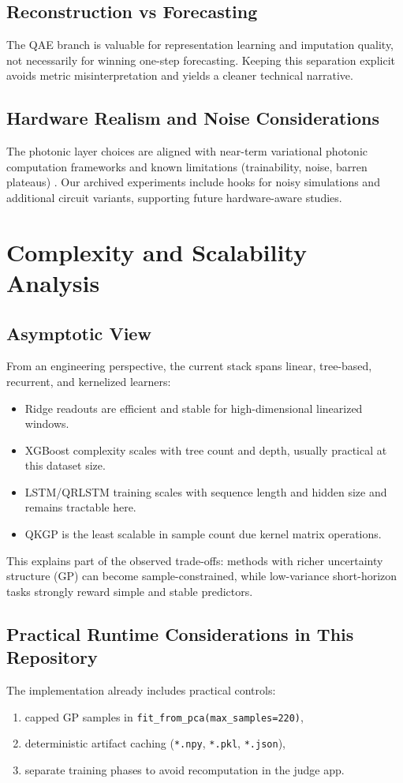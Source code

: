 \documentclass[11pt]{article}
\begin{document}
\subsection{Reconstruction vs Forecasting}
The QAE branch is valuable for representation learning and imputation quality, not necessarily for winning one-step forecasting. Keeping this separation explicit avoids metric misinterpretation and yields a cleaner technical narrative.

\subsection{Hardware Realism and Noise Considerations}
The photonic layer choices are aligned with near-term variational photonic computation frameworks and known limitations (trainability, noise, barren plateaus) \cite{cerezo2021vqa,mcclean2018barren}. Our archived experiments include hooks for noisy simulations and additional circuit variants, supporting future hardware-aware studies.

\section{Complexity and Scalability Analysis}
\subsection{Asymptotic View}
From an engineering perspective, the current stack spans linear, tree-based, recurrent, and kernelized learners:
\begin{itemize}[leftmargin=1.4em]
  \item Ridge readouts are efficient and stable for high-dimensional linearized windows.
  \item XGBoost complexity scales with tree count and depth, usually practical at this dataset size.
  \item LSTM/QRLSTM training scales with sequence length and hidden size and remains tractable here.
  \item QKGP is the least scalable in sample count due kernel matrix operations.
\end{itemize}

This explains part of the observed trade-offs: methods with richer uncertainty structure (GP) can become sample-constrained, while low-variance short-horizon tasks strongly reward simple and stable predictors.

\subsection{Practical Runtime Considerations in This Repository}
The implementation already includes practical controls:
\begin{enumerate}[leftmargin=1.4em]
  \item capped GP samples in \texttt{fit\_from\_pca(max\_samples=220)},
  \item deterministic artifact caching (\texttt{*.npy}, \texttt{*.pkl}, \texttt{*.json}),
  \item separate training phases to avoid recomputation in the judge app.
\end{enumerate}
\end{document}
